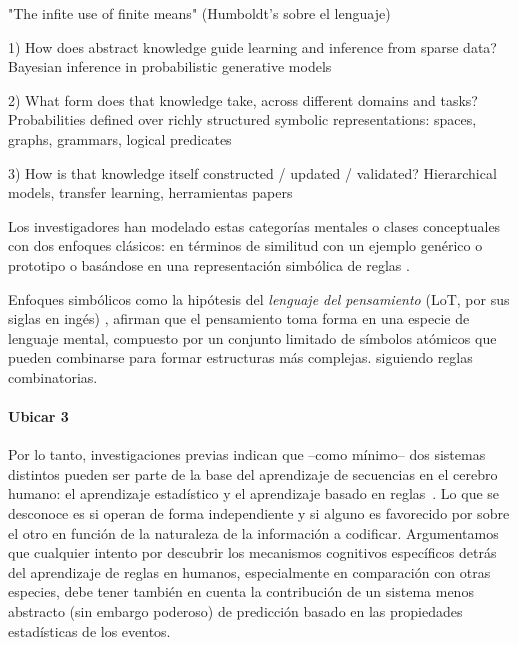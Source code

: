 "The infite use of finite means" (Humboldt's sobre el lenguaje)

1) How does abstract knowledge guide learning and inference from sparse data?
Bayesian inference in probabilistic generative models

2) What form does that knowledge take, across different domains and tasks?
Probabilities defined over richly structured symbolic representations: spaces, graphs, grammars, logical predicates

3) How is that knowledge itself constructed / updated / validated?
Hierarchical models, transfer learning, herramientas papers


Los investigadores han modelado estas categorías mentales o clases conceptuales con dos enfoques clásicos: en términos de similitud con un ejemplo genérico o prototipo \cite{rosch1999principles, nosofsky1986attention, rosch1976structural, rosch1975family} o basándose en una representación simbólica de reglas \cite{boole1854investigation, fodor1975language, gentner1983structure}.

Enfoques simbólicos como la hipótesis del \textit{lenguaje del pensamiento} (LoT, por sus siglas en ingés) \cite{fodor1975language}, afirman que el pensamiento toma forma en una especie de lenguaje mental, compuesto por un conjunto limitado de símbolos atómicos que pueden combinarse para formar estructuras más complejas. siguiendo reglas combinatorias.

\paragraph{Ubicar 3}

Por lo tanto, investigaciones previas indican que --como mínimo-- dos sistemas distintos pueden ser parte de la base del aprendizaje de secuencias en el cerebro humano: el aprendizaje estadístico y el aprendizaje basado en reglas~\cite{f4,f67,f85}. Lo que se desconoce es si operan de forma independiente y si alguno es favorecido por sobre el otro en función de la naturaleza de la información a codificar. Argumentamos que cualquier intento por descubrir los mecanismos cognitivos específicos detrás del aprendizaje de reglas en humanos, especialmente en comparación con otras especies, debe tener también en cuenta la contribución de un sistema menos abstracto (sin embargo poderoso) de predicción basado en las propiedades estadísticas de los eventos. 



